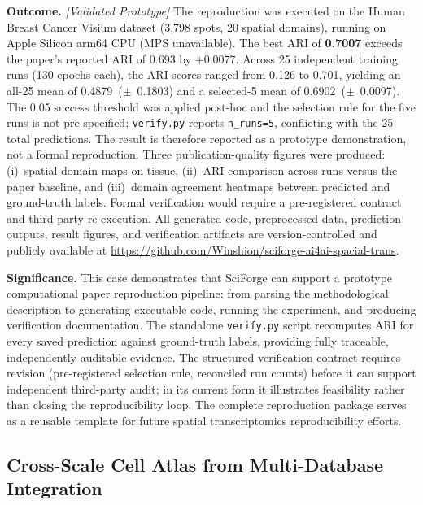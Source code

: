 \documentclass[sn-basic,Numbered,pdflatex]{sn-jnl}
\begin{document}
\textbf{Outcome.} \textit{[Validated Prototype]} The reproduction was executed on the Human Breast Cancer Visium dataset (3,798 spots, 20 spatial domains), running on Apple Silicon arm64 CPU (MPS unavailable). The best ARI of \textbf{0.7007} exceeds the paper's reported ARI of 0.693 by $+$0.0077. Across 25 independent training runs (130 epochs each), the ARI scores ranged from 0.126 to 0.701, yielding an all-25 mean of 0.4879~($\pm$~0.1803) and a selected-5 mean of 0.6902~($\pm$~0.0097). The 0.05 success threshold was applied post-hoc and the selection rule for the five runs is not pre-specified; \texttt{verify.py} reports \texttt{n\_runs=5}, conflicting with the 25 total predictions. The result is therefore reported as a prototype demonstration, not a formal reproduction. Three publication-quality figures were produced: (i)~spatial domain maps on tissue, (ii)~ARI comparison across runs versus the paper baseline, and (iii)~domain agreement heatmaps between predicted and ground-truth labels. Formal verification would require a pre-registered contract and third-party re-execution. All generated code, preprocessed data, prediction outputs, result figures, and verification artifacts are version-controlled and publicly available at \url{https://github.com/Winshion/sciforge-ai4ai-spacial-trans}.

\textbf{Significance.} This case demonstrates that SciForge can support a prototype computational paper reproduction pipeline: from parsing the methodological description to generating executable code, running the experiment, and producing verification documentation. The standalone \texttt{verify.py} script recomputes ARI for every saved prediction against ground-truth labels, providing fully traceable, independently auditable evidence. The structured verification contract requires revision (pre-registered selection rule, reconciled run counts) before it can support independent third-party audit; in its current form it illustrates feasibility rather than closing the reproducibility loop. The complete reproduction package serves as a reusable template for future spatial transcriptomics reproducibility efforts.


\subsection{Cross-Scale Cell Atlas from Multi-Database Integration}
\end{document}
